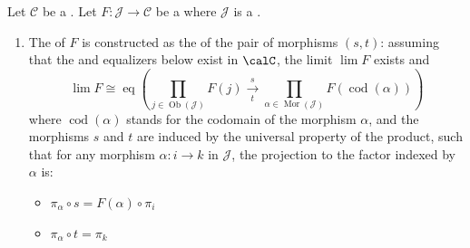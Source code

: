 \begin{theorem} \label{theorem:limits_colimits_are_equalizers_coequaulizers_of_products_coproducts}
    Let $\mathcal{C}$ be a . Let $F: \mathcal{J} \to \mathcal{C}$ be a  where $\mathcal{J}$ is a . 

    \begin{enumerate}
        \item The  of $F$ is constructed as the  of the pair of morphisms $(s, t)$: assuming that the  and equalizers below exist in $\calC$, the limit $\lim F$ exists and 
        \[
        \lim F \cong \operatorname{eq} \left( 
        \prod_{j \in \operatorname{Ob}(\mathcal{J})} F(j) 
        \xrightarrow[\;t\;]{\;s\;} 
        \prod_{\alpha \in \operatorname{Mor}(\mathcal{J})} F(\operatorname{cod}(\alpha)) 
        \right)
        \]
        where $\operatorname{cod}(\alpha)$ stands for the codomain of the morphism $\alpha$, and the morphisms $s$ and $t$ are induced by the universal property of the product, such that for any morphism $\alpha: i \to k$ in $\mathcal{J}$, the projection to the factor indexed by $\alpha$ is:
        \begin{itemize}
            \item $\pi_{\alpha} \circ s = F(\alpha) \circ \pi_{i}$
            \item $\pi_{\alpha} \circ t = \pi_{k}$
        \end{itemize}


\end{enumerate}
\end{theorem}
